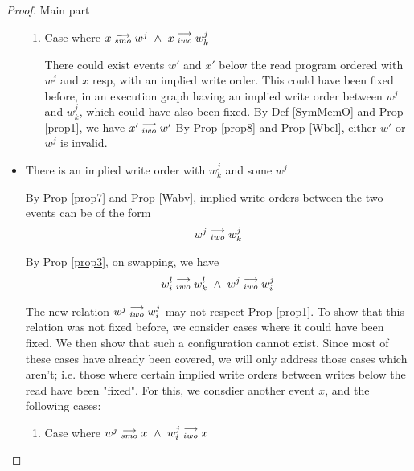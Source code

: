 \begin{proof}{Main part}
\begin{itemize}
\begin{enumerate}
                            \item Case where $x\stackrel{\longrightarrow}{_{smo}}w^j \ \wedge \ x\stackrel{\longrightarrow}{_{iwo}}w_k^j$
                                
                                There could exist events $w'$ and $x'$ below the read program ordered with $w^j$ and $x$ resp, with an implied write order. This could have been fixed before, in an execution graph having an implied write order between $w^j$ and $w_k^j$, which could have also been fixed.
                                By Def \ref{SymMemO} and Prop \ref{prop1}, we have $x'\stackrel{\longrightarrow}{_{iwo}}w'$
                                By Prop \ref{prop8} and Prop \ref{Wbel}, either $w'$ or $w^j$ is invalid.
                        
                        \end{enumerate}

                    \item There is an implied write order with $w_k^j$ and some $w^j$

                        By Prop \ref{prop7} and Prop \ref{Wabv}, implied write orders between the two events can be of the form 
                        \begin{align*}
                            w^j\stackrel{\longrightarrow}{_{iwo}}w_k^j  
                        \end{align*}

                        By Prop \ref{prop3}, on swapping, we have 
                        \begin{align*}
                            \reln{w_i^l}{iwo}{w_k^l} \ \wedge \ \reln{w^j}{iwo}{w_i^j}
                        \end{align*}

                        The new relation $w^j\stackrel{\longrightarrow}{_{iwo}}w_i^j$ may not respect Prop \ref{prop1}. 
                        To show that this relation was not fixed before, we consider cases where it could have been fixed. We then show that such a configuration cannot exist. Since most of these cases have already been covered, we will only address those cases which aren't; i.e. those where certain implied write orders between writes below the read have been "fixed". For this, we consdier another event $x$, and the following cases:

                        \begin{enumerate}
                            \item Case where $w^j\stackrel{\longrightarrow}{_{smo}}x \ \wedge \ w_i^j\stackrel{\longrightarrow}{_{iwo}}x$
                                

\end{enumerate}
\end{itemize}
\end{proof}
